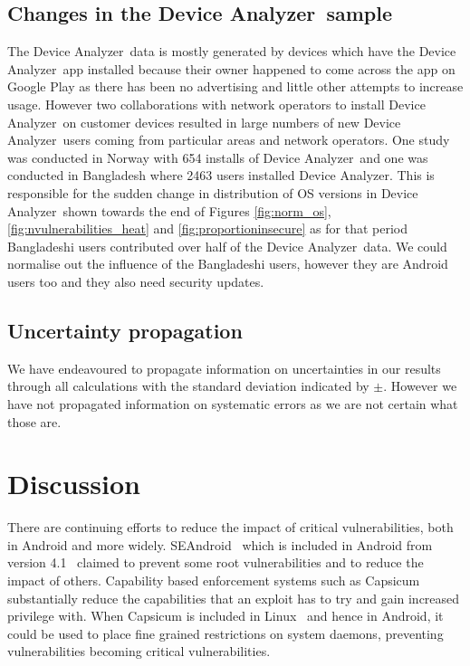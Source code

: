 \documentclass[conference,a4paper,twoside]{IEEEtran}
\newcommand{\da}{Device Analyzer}
\begin{document}
\subsection{Changes in the \da\ sample}
The \da\ data is mostly generated by devices which have the \da\ app installed because their owner happened to come across the app on Google Play as there has been no advertising and little other attempts to increase usage.
However two collaborations with network operators to install \da\ on customer devices resulted in large numbers of new \da\ users coming from particular areas and network operators.
One study was conducted in Norway with 654 installs of \da\ and one was conducted in Bangladesh where 2463 users installed \da.
This is responsible for the sudden change in distribution of OS versions in \da\ shown towards the end of Figures \ref{fig:norm_os}, \ref{fig:nvulnerabilities_heat} and \ref{fig:proportioninsecure} as for that period Bangladeshi users contributed over half of the \da\ data.
We could normalise out the influence of the Bangladeshi users, however they are Android users too and they also need security updates.


\subsection{Uncertainty propagation}
\label{sec:uncertainty}
We have endeavoured to propagate information on uncertainties in our results through all calculations with the standard deviation indicated by $\pm$.
However we have not propagated information on systematic errors as we are not certain what those are.

\section{Discussion}
There are continuing efforts to reduce the impact of critical vulnerabilities, both in Android and more widely.
SEAndroid~\cite{Smalley2013} which is included in Android from version 4.1~\cite{jelly-bean-release} claimed to prevent some root vulnerabilities and to reduce the impact of others.
Capability based enforcement systems such as Capsicum~\cite{Watson2010} substantially reduce the capabilities that an exploit has to try and gain increased privilege with.
When Capsicum is included in Linux~\cite{TODO} and hence in Android, it could be used to place fine grained restrictions on system daemons, preventing vulnerabilities becoming critical vulnerabilities.
\end{document}
